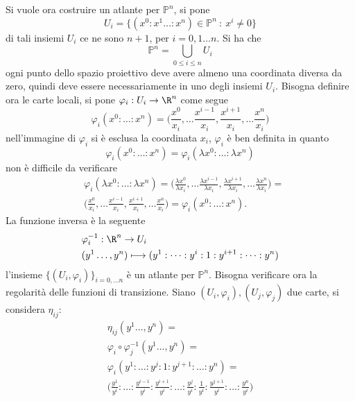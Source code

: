 \documentclass[10pt, letterpaper]{report}
\begin{document}
Si vuole ora costruire un atlante per $\mathbb P^n$, si pone\begin{equation}
    U_i=\{(x^0:x^1\dots : x^n)\in \mathbb P^n \ : \ x^i\ne 0\}
\end{equation}
di tali insiemi $U_i$ ce ne sono $n+1$, per $i=0,1\dots n$. Si ha che \begin{equation}
    \mathbb P^n=\bigcup_{0\le i\le n}U_i
\end{equation}
ogni punto dello spazio proiettivo deve avere almeno una coordinata diversa da zero, quindi deve essere necessariamente in uno degli insiemi $U_i$. Bisogna definire ora le carte locali, si pone $\varphi_i:U_i\rightarrow\R^n$ come segue\begin{equation}
    \varphi_i(x^0:\dots:x^n)=\big(
    \frac{x^0}{x_i},\dots \frac{x^{i-1}}{x_i},\frac{x^{i+1}}{x_i} ,\dots\frac{x^{n}}{x_i}       
    \big)
\end{equation}
nell'immagine di $\varphi_i$ si è esclusa la coordinata $x_i$, $\varphi_i$ è ben definita in quanto \begin{equation}
    \varphi_i(x^0:\dots:x^n)=\varphi_i(\lambda x^0:\dots:\lambda x^n)
\end{equation}
non è difficile da verificare\begin{align}
    &\varphi_i(\lambda x^0:\dots:\lambda x^n)=\big(
    \frac{\lambda x^0}{\lambda x_i},\dots \frac{\lambda x^{i-1}}{\lambda x_i},\frac{\lambda x^{i+1}}{\lambda x_i} ,\dots\frac{\lambda x^{n}}{\lambda x_i}       
    \big)=\\&\big(
    \frac{x^0}{x_i},\dots \frac{x^{i-1}}{x_i},\frac{x^{i+1}}{x_i} ,\dots\frac{x^{n}}{x_i}       
    \big)=\varphi_i(x^0:\dots:x^n).
\end{align}
La funzione inversa è la seguente\begin{align}
    &\varphi_i^{-1}:\R^n\rightarrow U_i\\ 
    &(y^1\dots,y^n)\longmapsto (y^1:\dots:y^i:1:y^{i+1}:\dots : y^n)
\end{align}
l'insieme $\{(U_i,\varphi_i)\}_{i=0,\dots n}$ è un atlante per $\mathbb P^n$. Bisogna verificare ora la regolarità delle funzioni di transizione. Siano $(U_i,\varphi_i),(U_j,\varphi_j)$ due carte, si considera $\eta_{ij}$:\begin{eqnarray}
    \eta_{ij}(y^1\dots,y^n)=\\
    \varphi_i\circ\varphi_j^{-1}(y^1\dots,y^n)=\\
    \varphi_i(y^1:\dots:y^j:1:y^{j+1}:\dots : y^n)=\\ 
    \big(
    \frac{y^1}{y^i}:\dots :   \frac{y^{i-1}}{y^i}  :\frac{y^{i+1}}{y^i}  :\dots :  
    \frac{y^{j}}{y^i} :\frac{1}{y^i}  :\frac{y^{j+1}}{y^i} :\dots : \frac{y^{n}}{y^i} 
    \big)
\end{eqnarray}
\end{document}
